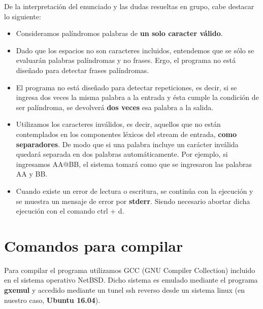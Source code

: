 \documentclass[a4paper,10pt]{article}
\begin{document}
De la interpretaci\'on del enunciado y las dudas resueltas en grupo, cabe destacar lo siguiente:\\
\begin{itemize}
	\item Consideramos pal\'indromos palabras de \textbf{un solo caracter v\'alido}.
	\item Dado que los espacios no son caracteres incluidos, entendemos
	que se s\'olo se evaluar\'an palabras pal\'indromas y no frases.
	Ergo, el programa no est\'a dise\~nado para detectar
	frases pal\'indromas.
	\item El programa no est\'a dise\~nado para detectar repeticiones,
	es decir, si se ingresa dos veces la misma palabra a la entrada y
	\'esta cumple la condici\'on de ser pal\'indroma, se devolver\'a
	\textbf{dos veces} esa palabra a la salida.
	\item Utilizamos los caracteres inv\'alidos, es decir, aquellos que
	no est\'an contemplados en los componentes l\'exicos del stream de
	entrada, \textbf{como separadores}. De modo que si una palabra incluye un
	car\'acter inv\'alida quedar\'a separada en dos palabras
	autom\'aticamente.
	Por ejemplo, si ingresamos AA@BB, el sistema tomar\'a como que
	se ingresaron las palabras AA y BB.
	\item Cuando existe un error de lectura o escritura, se contin\'ua
	con la ejecuci\'on y se muestra un mensaje de error por
	\textbf{stderr}. Siendo necesario abortar dicha ejecuci\'on
	con el comando ctrl + d.
\end{itemize}


\section{Comandos para compilar}

Para compilar el programa utilizamos GCC (GNU Compiler Collection) incluido
en el sistema operativo NetBSD. Dicho sistema es emulado mediante el programa
\textbf{gxemul} y accedido mediante un tunel ssh reverso desde un sistema
linux (en nuestro caso, \textbf{Ubuntu 16.04}).\\
\end{document}
